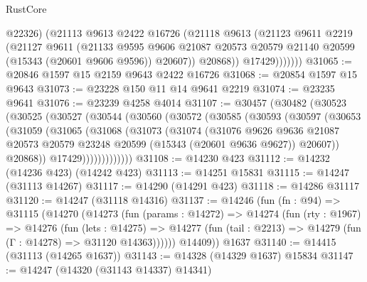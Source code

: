 \begin{lexlean}{RustCore}
\begin{coremodule}
                  @22326)
                (@21113
                  @9613
                  @2422
                  @16726
                  (@21118
                    @9613
                    (@21123
                      @9611
                      @2219
                      (@21127
                        @9611
                        (@21133
                          @9595
                          @9606
                          @21087
                          @20573
                          @20579
                          @21140
                          @20599
                          (@15343 (@20601 @9606 @9596))
                          @20607))
                      @20868))
                  @17429)))))))
@31065 := @20846 @1597 @15 @2159 @9643 @2422 @16726
@31068 := @20854 @1597 @15 @9643
@31073 := @23228 @150 @11 @14 @9641 @2219
@31074 := @23235 @9641
@31076 := @23239 @4258 @4014
@31107 := @30457
    (@30482
      (@30523
        (@30525
          (@30527
            (@30544
              (@30560
                (@30572
                  (@30585
                    (@30593
                      (@30597
                        (@30653
                          (@31059
                            (@31065
                              (@31068
                                (@31073
                                  (@31074
                                    (@31076
                                      @9626
                                      @9636
                                      @21087
                                      @20573
                                      @20579
                                      @23248
                                      @20599
                                      (@15343 (@20601 @9636 @9627))
                                      @20607))
                                  @20868))
                              @17429)))))))))))))
@31108 := @14230 @423
@31112 := @14232 (@14236 @423) (@14242 @423)
@31113 := @14251 @15831
@31115 := @14247 (@31113 @14267)
@31117 := @14290 (@14291 @423)
@31118 := @14286 @31117
@31120 := @14247 (@31118 @14316)
@31137 := @14246
    (fun (fn : @94) =>
    @31115
      (@14270
        (@14273
          (fun (params : @14272) =>
          @14274
            (fun (rty : @1967) =>
            @14276
              (fun (lets : @14275) =>
              @14277 (fun (tail : @2213) => @14279 (fun (Γ : @14278) => @31120 @14363))))))
        @14409))
    @1637
@31140 := @14415 (@31113 (@14265 @1637))
@31143 := @14328 (@14329 @1637) @15834
@31147 := @14247 (@14320 (@31143 @14337) @14341)

\end{coremodule}
\end{lexlean}
